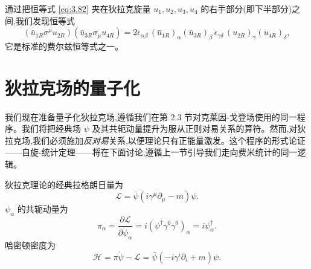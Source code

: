 通过把恒等式 \eqref{eq:3.82} 夹在狄拉克旋量 $u_1, u_2, u_3, u_4$ 的右手部分(即下半部分)之间,我们发现恒等式
\begin{equation}
  (\bar{u}_{1R}\sigma^\mu u_{2R})(\bar{u}_{3R}\sigma_\mu u_{4R})
    = 2\epsilon_{\alpha\beta}\,
    (\bar{u}_{1R})_\alpha(\bar{u}_{3R})_\beta\,
    \epsilon_{\gamma\delta}\,
    (u_{2R})_\gamma(u_{4R})_\delta ,
  \label{eq:3.83}
\end{equation}
它是标准的费尔兹恒等式之一。

\section{狄拉克场的量子化}

我们现在准备量子化狄拉克场,遵循我们在第 2.3 节对克莱因-戈登场使用的同一程序。我们将把经典场 $\psi$ 及其共轭动量提升为服从正则对易关系的算符。然而,对狄拉克场,我们必须施加\emph{反对易}关系,以便理论只有正能量激发。这个程序的形式论证——自旋-统计定理——将在下面讨论,遵循上一节引导我们走向费米统计的同一逻辑。

狄拉克理论的经典拉格朗日量为
\begin{equation}
  \mathcal{L} = \bar{\psi}(i\gamma^\mu\partial_\mu - m)\psi .
  \label{eq:3.84}
\end{equation}
$\psi_\alpha$ 的共轭动量为
\begin{equation}
  \pi_\alpha = \frac{\partial\mathcal{L}}{\partial\dot{\psi}_\alpha}
    = i(\psi^\dagger\gamma^0\gamma^0)_\alpha = i\psi^\dagger_\alpha .
  \label{eq:3.85}
\end{equation}
哈密顿密度为
\begin{equation}
  \mathcal{H} = \pi\dot{\psi} - \mathcal{L}
    = \bar{\psi}(-i\gamma^i\partial_i + m)\psi .
  \label{eq:3.86}
\end{equation}


